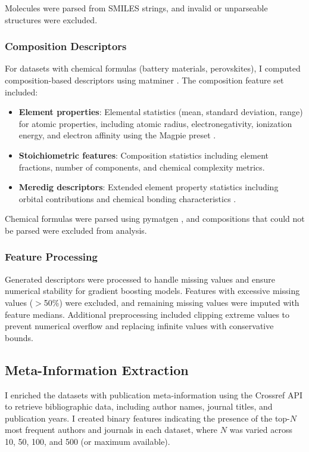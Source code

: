 \documentclass[11pt, oneside]{article}
\begin{document}
Molecules were parsed from SMILES strings, and invalid or unparseable structures were excluded. 
\subsubsection{Composition Descriptors}
For datasets with chemical formulas (battery materials, perovskites), I computed composition-based descriptors using matminer \autocite{matminer}. The composition feature set included:

\begin{itemize}
    \item \textbf{Element properties}: Elemental statistics (mean, standard deviation, range) for atomic properties, including atomic radius, electronegativity, ionization energy, and electron affinity using the Magpie preset \autocite{ward2016general}.
    \item \textbf{Stoichiometric features}: Composition statistics including element fractions, number of components, and chemical complexity metrics.
    \item \textbf{Meredig descriptors}: Extended element property statistics including orbital contributions and chemical bonding characteristics \autocite{meredig2014combinatorial}.
\end{itemize}

Chemical formulas were parsed using pymatgen \autocite{pymatgen}, and compositions that could not be parsed were excluded from analysis. 

\subsubsection{Feature Processing}
Generated descriptors were processed to handle missing values and ensure numerical stability for gradient boosting models. Features with excessive missing values ($>$50\%) were excluded, and remaining missing values were imputed with feature medians. Additional preprocessing included clipping extreme values to prevent numerical overflow and replacing infinite values with conservative bounds.

\subsection{Meta-Information Extraction}

I enriched the datasets with publication meta-information using the Crossref API to retrieve bibliographic data, including author names, journal titles, and publication years. I created binary features indicating the presence of the top-$N$ most frequent authors and journals in each dataset, where $N$ was varied across 10, 50, 100, and 500 (or maximum available).
\end{document}
